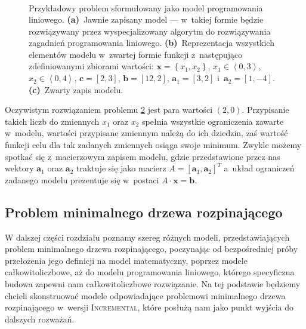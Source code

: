\begin{figure}[!htbp]
\begin{subfigure}[b]{0.3\textwidth}
\begin{subequations}
\begin{alignat*}{4}
			\end{alignat*}
		\end{subequations}
		\caption{}
		\label{fig:lpexample:c}
	\end{subfigure}
	\hfill\null
	\caption{
		Przykładowy problem sformułowany jako model programowania liniowego.
		\textbf{(a)}~Jawnie zapisany model --- w~takiej formie będzie rozwiązywany przez wyspecjalizowany algorytm do rozwiązywania zagadnień programowania liniowego.
		\textbf{(b)}~Reprezentacja wszystkich elementów modelu w~zwartej formie funkcji z~następująco zdefiniowanymi zbiorami wartości: $\textbf{x} = \left\{ x_{1}, x_{2} \right\}$, $x_{1} \in \left\langle 0, 3 \right\rangle$, $x_{2} \in \left\langle 0, 4 \right\rangle$, $\textbf{c} = \left[ 2, 3 \right]$, $\textbf{b} = \left[ 12, 2 \right]$, $\textbf{a}_{1} = \left[ 3, 2 \right]$ i~$\textbf{a}_{2} = \left[ 1, -4 \right]$.
		\textbf{(c)}~Zwarty zapis modelu.
	}
	\label{fig:lpexample}
\end{figure}

Oczywistym rozwiązaniem problemu \ref{fig:lpexample} jest para wartości $\left( 2, 0 \right)$.
Przypisanie takich liczb do zmiennych $x_{1}$ oraz $x_{2}$ spełnia wszystkie ograniczenia zawarte w~modelu, wartości przypisane zmiennym należą do ich dziedzin, zaś wartość funkcji celu dla tak zadanych zmiennych osiąga swoje minimum.
Zwykle możemy spotkać się z~macierzowym zapisem modelu, gdzie przedstawione przez nas wektory $\textbf{a}_{1}$ oraz $\textbf{a}_{2}$ traktuje się jako macierz $A = \left[ \textbf{a}_{1}, \textbf{a}_{2} \right]^{T}$ a~układ ograniczeń zadanego modelu prezentuje się w~postaci $A \cdot \textbf{x} = \textbf{b}$.



\subsection{Problem minimalnego drzewa rozpinającego}



W dalszej części rozdziału poznamy szereg różnych modeli, przedstawiających problem minimalnego drzewa rozpinającego, poczynając od bezpośredniej próby przełożenia jego definicji na model matematyczny, poprzez modele całkowitoliczbowe, aż do modelu programowania liniowego, którego specyficzna budowa zapewni nam całkowitoliczbowe rozwiązanie.
Na tej podstawie będziemy chcieli skonstruować modele odpowiadające problemowi minimalnego drzewa rozpinającego w~wersji \textsc{Incremental}, które posłużą nam jako punkt wyjścia do dalszych rozważań.



